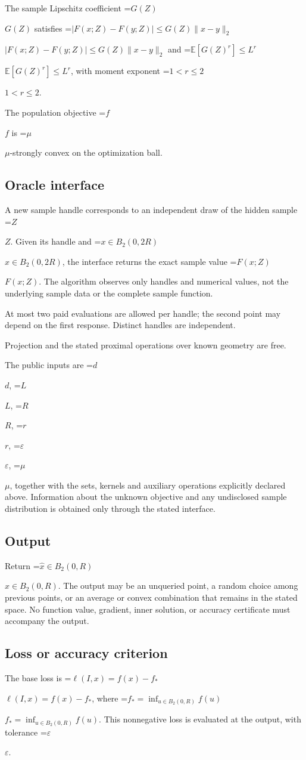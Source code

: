 \documentclass[10pt,a4paper]{article}
\newcommand{\AtlasMath}[1]{\par\begingroup\centering\setbox0=\hbox{$\displaystyle #1$}\ifdim\wd0>1.4\linewidth\typeout{ATLAS WIDE FORMULA: \the\wd0}\fi\ifdim\wd0>\linewidth\resizebox{\linewidth}{!}{\box0}\else\box0\fi\par\endgroup}
\newcommand{\AtlasInlineMath}[1]{\begingroup\setbox0=\hbox{$#1$}\ifdim\wd0>.4\linewidth\endgroup\AtlasMath{#1}\else\endgroup$#1$\fi}
\begin{document}
The sample Lipschitz coefficient \AtlasInlineMath{G(Z)} satisfies \AtlasInlineMath{|F(x;Z)-F(y;Z)|\le G(Z)\|x-y\|_2} and \AtlasInlineMath{\mathbb{E}[G(Z)^r]\le L^r}, with moment exponent \AtlasInlineMath{1<r\le2}.

The population objective \AtlasInlineMath{f} is \AtlasInlineMath{\mu}-strongly convex on the optimization ball.

\subsection{Oracle interface}
A new sample handle corresponds to an independent draw of the hidden sample \AtlasInlineMath{Z}. Given its handle and \AtlasInlineMath{x\in B_2(0,2R)}, the interface returns the exact sample value \AtlasInlineMath{F(x;Z)}. The algorithm observes only handles and numerical values, not the underlying sample data or the complete sample function.

At most two paid evaluations are allowed per handle; the second point may depend on the first response. Distinct handles are independent.

Projection and the stated proximal operations over known geometry are free.

The public inputs are \AtlasInlineMath{d}, \AtlasInlineMath{L}, \AtlasInlineMath{R}, \AtlasInlineMath{r}, \AtlasInlineMath{\varepsilon}, \AtlasInlineMath{\mu}, together with the sets, kernels and auxiliary operations explicitly declared above. Information about the unknown objective and any undisclosed sample distribution is obtained only through the stated interface.

\subsection{Output}
Return \AtlasInlineMath{\widehat{x}\in B_2(0,R)}. The output may be an unqueried point, a random choice among previous points, or an average or convex combination that remains in the stated space. No function value, gradient, inner solution, or accuracy certificate must accompany the output.

\subsection{Loss or accuracy criterion}
The base loss is \AtlasInlineMath{\ell(I,x)=f(x)-f_*}, where \AtlasInlineMath{f_*=\inf_{u\in B_2(0,R)}f(u)}. This nonnegative loss is evaluated at the output, with tolerance \AtlasInlineMath{\varepsilon}.
\end{document}
